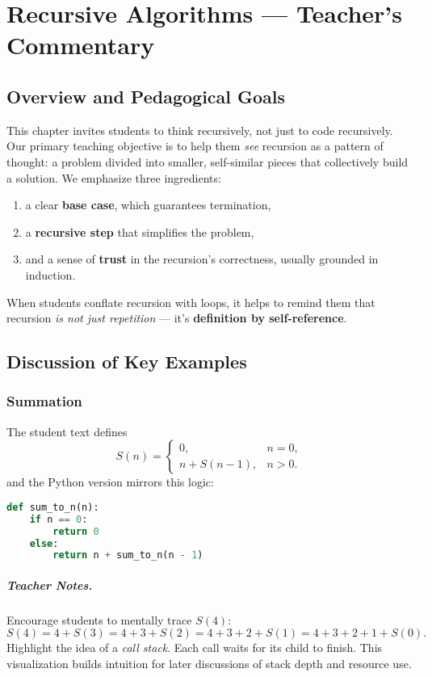 \chapter{Recursive Algorithms — Teacher’s Commentary}
\label{ch:recursive-algorithms-solution}

\section{Overview and Pedagogical Goals}
This chapter invites students to think recursively, not just to code recursively. 
Our primary teaching objective is to help them \emph{see} recursion as a pattern of thought:
a problem divided into smaller, self-similar pieces that collectively build a solution.
We emphasize three ingredients:
\begin{enumerate}
  \item a clear \textbf{base case}, which guarantees termination,
  \item a \textbf{recursive step} that simplifies the problem,
  \item and a sense of \textbf{trust} in the recursion’s correctness, usually grounded in induction.
\end{enumerate}

When students conflate recursion with loops, it helps to remind them that recursion 
\emph{is not just repetition} — it’s \textbf{definition by self-reference}.

\section{Discussion of Key Examples}

\subsection{Summation}
The student text defines
\[
S(n) =
\begin{cases}
0, & n = 0, \\
n + S(n-1), & n > 0.
\end{cases}
\]
and the Python version mirrors this logic:
\begin{lstlisting}[language=Python]
def sum_to_n(n):
    if n == 0:
        return 0
    else:
        return n + sum_to_n(n - 1)
\end{lstlisting}

\paragraph{Teacher Notes.}
Encourage students to mentally trace $S(4)$:
\[
S(4) = 4 + S(3) = 4 + 3 + S(2) = 4 + 3 + 2 + S(1) = 4 + 3 + 2 + 1 + S(0).
\]
Highlight the idea of a \textit{call stack}. Each call waits for its child to finish.
This visualization builds intuition for later discussions of stack depth and resource use.


